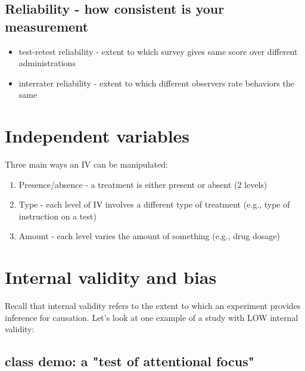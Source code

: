\documentclass[11pt]{article}
\begin{document}
\subsection*{Reliability - how consistent is your measurement}
\label{sec-1-3}
\begin{itemize}
\item test-retest reliability - extent to which survey gives same score over different administrations
\item interrater reliability - extent to which different observers rate behaviors the same
\end{itemize}

\section*{Independent variables}
\label{sec-2}

Three main ways an IV can be manipulated:
\begin{enumerate}
\item Presence/absence - a treatment is either present or absent (2 levels)
\item Type - each level of IV involves a different type of treatment (e.g., type of instruction on a test)
\item Amount - each level varies the amount of something (e.g., drug dosage)
\end{enumerate}

\section*{Internal validity and bias}
\label{sec-3}
Recall that internal validity refers to the extent to which an experiment provides inference for causation.
Let's look at one example of a study with LOW internal validity:

\subsection*{class demo: a "test of attentional focus"}
\label{sec-3-1}
\end{document}

